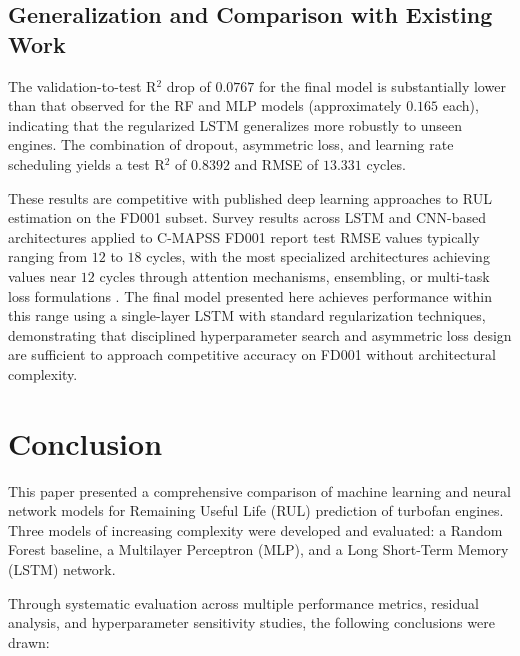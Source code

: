 \documentclass[conference]{IEEEtran}
\begin{document}
\subsection{Generalization and Comparison with Existing Work}

The validation-to-test R$^2$ drop of $0.0767$ for the final model is substantially lower than that observed for the RF and MLP models (approximately $0.165$ each), indicating that the regularized LSTM generalizes more robustly to unseen engines. The combination of dropout, asymmetric loss, and learning rate scheduling yields a test R$^2$ of $0.8392$ and RMSE of $13.331$ cycles.

These results are competitive with published deep learning approaches to RUL estimation on the FD001 subset. Survey results across LSTM and CNN-based architectures applied to C-MAPSS FD001 report test RMSE values typically ranging from $12$ to $18$ cycles, with the most specialized architectures achieving values near $12$ cycles through attention mechanisms, ensembling, or multi-task loss formulations \cite{ref3}. The final model presented here achieves performance within this range using a single-layer LSTM with standard regularization techniques, demonstrating that disciplined hyperparameter search and asymmetric loss design are sufficient to approach competitive accuracy on FD001 without architectural complexity.

\section{Conclusion}

This paper presented a comprehensive comparison of machine learning and neural network models for Remaining Useful Life (RUL) prediction of turbofan engines. Three models of increasing complexity were developed and evaluated: a Random Forest baseline, a Multilayer Perceptron (MLP), and a Long Short-Term Memory (LSTM) network.

Through systematic evaluation across multiple performance metrics, residual analysis, and hyperparameter sensitivity studies, the following conclusions were drawn:
\end{document}
